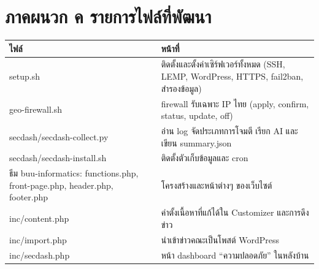 \section*{ภาคผนวก ค รายการไฟล์ที่พัฒนา}

\begingroup\small\begin{longtable}[]{@{}>{\raggedright\arraybackslash}p{}>{\raggedright\arraybackslash}p{}@{}}
\toprule\noalign{}
ไฟล์ & หน้าที่ \\
\midrule\noalign{}
\endhead
\bottomrule\noalign{}
\endlastfoot
setup.sh & ติดตั้งและตั้งค่าเซิร์ฟเวอร์ทั้งหมด (SSH, LEMP, WordPress, HTTPS, fail2ban, สำรองข้อมูล) \\
geo-firewall.sh & firewall รับเฉพาะ IP ไทย (apply, confirm, status, update, off) \\
secdash/secdash-collect.py & อ่าน log จัดประเภทการโจมตี เรียก AI และเขียน summary.json \\
secdash/secdash-install.sh & ติดตั้งตัวเก็บข้อมูลและ cron \\
ธีม buu-informatics: functions.php, front-page.php, header.php, footer.php & โครงสร้างและหน้าต่างๆ ของเว็บไซต์ \\
inc/content.php & ค่าตั้งเนื้อหาที่แก้ได้ใน Customizer และการดึงข่าว \\
inc/import.php & นำเข้าข่าวคณะเป็นโพสต์ WordPress \\
inc/secdash.php & หน้า dashboard ``ความปลอดภัย'' ในหลังบ้าน \\
\end{longtable}\endgroup
